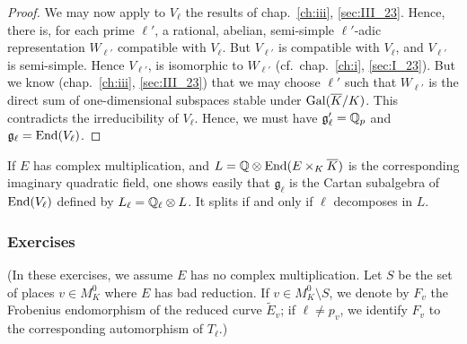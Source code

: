 \begin{proof}
	We may now apply to $V_\ell$ the results of chap.~\ref{ch:iii},
	\ref{sec:III_23}.  Hence, there is, for each prime $\ell'$, a rational,
	abelian, semi-simple $\ell'$-adic representation $W_{\ell'}$ compatible
	with $V_\ell$. But $V_{\ell'}$ is compatible with $V_\ell$, and
	$V_{\ell'}$ is semi-simple. Hence $V_{\ell'}$, is isomorphic to
	$W_{\ell'}$ (cf.\ chap.~\ref{ch:i}, \ref{sec:I_23}). But we know
	(chap.~\ref{ch:iii}, \ref{sec:III_23}) that we may choose $\ell'$ such
	\dpage
	that $W_{\ell'}$ is the direct sum of one-dimensional subspaces stable
	under $\operatorname{Gal}(\overline{K}/K)$. This contradicts the irreducibility of
	$V_\ell$. Hence, we must have $\mathfrak{g}_\ell^\prime = \mathbb{Q}_p$ and
	$\mathfrak{g}_\ell = \operatorname{End}(V_\ell)$.
\end{proof}

\begin{obs}
	If $E$ has complex multiplication, and $L = \mathbb{Q} \otimes \operatorname{End}(E \times_K
	\overline{K})$ is the corresponding imaginary quadratic field, one shows
	easily that $\mathfrak{g}_\ell$ is the Cartan subalgebra of
	$\operatorname{End}(V_\ell)$ defined by $L_\ell = \mathbb{Q}_\ell \otimes L$. It splits if and
	only if $\ell$ decomposes in $L$.
\end{obs}

\subsubsection*{Exercises}
(In these exercises, we assume $E$ has no complex multiplication. Let $S$ be
the set of places $v \in M_K^0$ where $E$ has bad reduction. If $v \in M_K^0
\setminus S$, we denote by $F_v$ the Frobenius endomorphism of the reduced
curve $\widetilde{E}_v$; if $\ell \ne p_v$, we identify $F_v$ to the
corresponding automorphism of $T_\ell$.)

